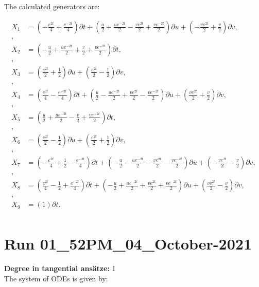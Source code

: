 \noindent The calculated generators are:

\begin{align*}
X_{1}&=\left( - \frac{e^{2 t}}{4} + \frac{e^{- 2 t}}{4} \right)\partial t+\left( \frac{u}{2} + \frac{u e^{- 2 t}}{2} - \frac{v e^{2 t}}{2} + \frac{v e^{- 2 t}}{2} \right)\partial u+\left( - \frac{v e^{2 t}}{2} + \frac{v}{2} \right)\partial v,\\
,\\
X_{2}&=\left( - \frac{u}{2} + \frac{u e^{- 2 t}}{2} + \frac{v}{2} + \frac{v e^{- 2 t}}{2} \right)\partial t,\\
,\\
X_{3}&=\left( \frac{e^{2 t}}{2} + \frac{1}{2} \right)\partial u+\left( \frac{e^{2 t}}{2} - \frac{1}{2} \right)\partial v,\\
,\\
X_{4}&=\left( \frac{e^{2 t}}{4} - \frac{e^{- 2 t}}{4} \right)\partial t+\left( \frac{u}{2} - \frac{u e^{- 2 t}}{2} + \frac{v e^{2 t}}{2} - \frac{v e^{- 2 t}}{2} \right)\partial u+\left( \frac{v e^{2 t}}{2} + \frac{v}{2} \right)\partial v,\\
,\\
X_{5}&=\left( \frac{u}{2} + \frac{u e^{- 2 t}}{2} - \frac{v}{2} + \frac{v e^{- 2 t}}{2} \right)\partial t,\\
,\\
X_{6}&=\left( \frac{e^{2 t}}{2} - \frac{1}{2} \right)\partial u+\left( \frac{e^{2 t}}{2} + \frac{1}{2} \right)\partial v,\\
,\\
X_{7}&=\left( - \frac{e^{2 t}}{4} + \frac{1}{2} - \frac{e^{- 2 t}}{4} \right)\partial t+\left( - \frac{u}{2} - \frac{u e^{- 2 t}}{2} - \frac{v e^{2 t}}{2} - \frac{v e^{- 2 t}}{2} \right)\partial u+\left( - \frac{v e^{2 t}}{2} - \frac{v}{2} \right)\partial v,\\
,\\
X_{8}&=\left( \frac{e^{2 t}}{4} - \frac{1}{2} + \frac{e^{- 2 t}}{4} \right)\partial t+\left( - \frac{u}{2} + \frac{u e^{- 2 t}}{2} + \frac{v e^{2 t}}{2} + \frac{v e^{- 2 t}}{2} \right)\partial u+\left( \frac{v e^{2 t}}{2} - \frac{v}{2} \right)\partial v,\\
,\\
X_{9}&=\left( 1 \right)\partial t.\\
\end{align*}
\section*{Run 01\_52PM\_04\_October-2021}
\textbf{Degree in tangential ansätze:}	1\\
The system of ODEs is given by:

